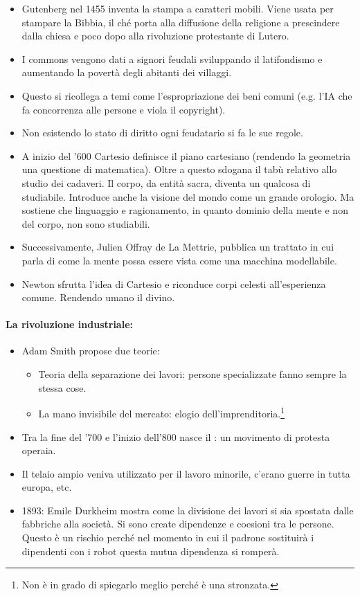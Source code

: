 \begin{itemize}
  \item Gutenberg nel 1455 inventa la stampa a caratteri mobili. Viene usata per stampare la Bibbia, il ché porta alla diffusione della religione a prescindere dalla chiesa e poco dopo alla rivoluzione protestante di Lutero.
  \item I commons vengono dati a signori feudali sviluppando il latifondismo e aumentando la povertà degli abitanti dei villaggi. 
  \item Questo si ricollega a temi come l'espropriazione dei beni comuni (e.g. l'IA che fa concorrenza alle persone e viola il copyright).
  \item Non esistendo lo stato di diritto ogni feudatario si fa le sue regole.
  \item A inizio del '600 Cartesio definisce il piano cartesiano (rendendo la geometria una questione di matematica). Oltre a questo sdogana il tabù relativo allo studio dei cadaveri. Il corpo, da entità sacra, diventa un qualcosa di studiabile. Introduce anche la visione del mondo come un grande orologio. Ma sostiene che linguaggio e ragionamento, in quanto dominio della mente e non del corpo, non sono studiabili.
  \item Successivamente, Julien Offray de La Mettrie, pubblica un trattato in cui parla di come la mente possa essere vista come una macchina modellabile. 
  \item Newton sfrutta l'idea di Cartesio e riconduce corpi celesti all'esperienza comune. Rendendo umano il divino. 
\end{itemize}

\paragraph{La rivoluzione industriale:}

\begin{itemize}
  \item Adam Smith propose due teorie:
    \begin{itemize}
      \item Teoria della separazione dei lavori: persone specializzate fanno sempre la stessa cose. 
      \item La mano invisibile del mercato: elogio dell'imprenditoria.\footnote{Non è in grado di spiegarlo meglio perché è una stronzata.}
    \end{itemize}
  \item Tra la fine del '700 e l'inizio dell'800 nasce il : un movimento di protesta operaia. 
  \item Il telaio ampio veniva utilizzato per il lavoro minorile, c'erano guerre in tutta europa, etc.
  \item 1893: Emile Durkheim mostra come la divisione dei lavori si sia spostata dalle fabbriche alla società. Si sono create dipendenze e coesioni tra le persone. Questo è un rischio perché nel momento in cui il padrone sostituirà i dipendenti con i robot questa mutua dipendenza si romperà.
\end{itemize}








